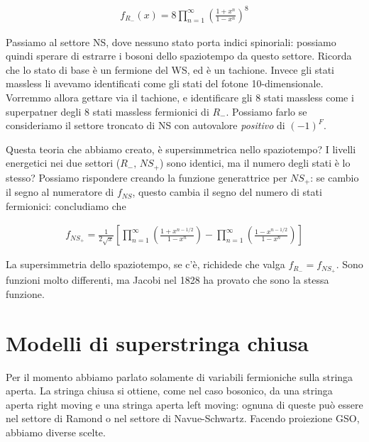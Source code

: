 \documentclass{report}
\begin{document}
\begin{align}
    f_{R_-}(x) = 8\prod_{n=1}^\infty \left( \frac{1+x^n}{1-x^n} \right)^8
\end{align}

Passiamo al settore NS, dove nessuno stato porta indici spinoriali: possiamo quindi sperare di estrarre i bosoni dello spaziotempo da questo settore. Ricorda che lo stato di base è un fermione del WS, ed è un tachione. Invece gli stati massless li avevamo identificati come gli stati del fotone 10-dimensionale. Vorremmo allora gettare via il tachione, e identificare gli 8 stati massless come i superpatner degli 8 stati massless fermionici di \(R_-\). Possiamo farlo se consideriamo il settore troncato di NS con autovalore \emph{positivo} di \((-1)^F\). 

Questa teoria che abbiamo creato, è supersimmetrica nello spaziotempo? I livelli energetici nei due settori (\(R_-, \, NS_+\)) sono identici, ma il numero degli stati è lo stesso? Possiamo rispondere creando la funzione generattrice per \(NS_+\): se cambio il segno al numeratore di \(f_{NS}\), questo cambia il segno del numero di stati fermionici: concludiamo che 

\begin{align}
    f_{NS_+} = \frac{1}{2\sqrt{x}}\left[ \prod_{n=1}^\infty \left( \frac{1+x^{n-1/2}}{1-x^n} \right)  - \prod_{n=1}^\infty\left( \frac{1-x^{n-1/2}}{1-x^n} \right)  \right]
\end{align}

La supersimmetria dello spaziotempo, se c'è, richidede che valga \(f_{R_-} = f_{NS_+}\). Sono funzioni molto differenti, ma Jacobi nel 1828 ha provato che sono la stessa funzione. 

\section{Modelli di superstringa chiusa}

Per il momento abbiamo parlato solamente di variabili fermioniche sulla stringa aperta. La stringa chiusa si ottiene, come nel caso bosonico, da una stringa aperta right moving e una stringa aperta left moving: ognuna di queste può essere nel settore di Ramond o nel settore di Navue-Schwartz. Facendo proiezione GSO, abbiamo diverse scelte.
\end{document}
